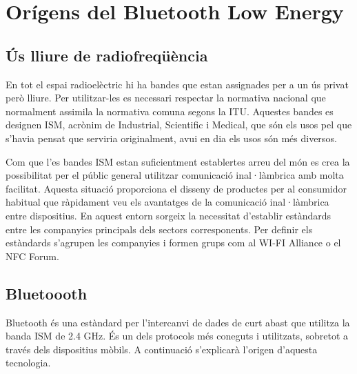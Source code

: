 \chapter{Orígens del Bluetooth Low Energy}\label{C:compaginacio}

\section{Ús lliure de radiofreqüència}
En tot el espai radioelèctric hi ha bandes que estan assignades per a un ús privat però lliure.
Per utilitzar-les es necessari respectar la normativa nacional que normalment assimila la normativa comuna segons la ITU.
Aquestes bandes es designen ISM, acrònim de Industrial, Scientific i Medical, que són els usos pel que s'havia pensat que serviria originalment, avui en dia els usos són més diversos.

Com que l'es bandes ISM estan suficientment establertes arreu del món es crea la possibilitat per el públic general utilitzar comunicació inal·làmbrica amb molta facilitat.
Aquesta situació proporciona el disseny de productes per al consumidor habitual que ràpidament veu els avantatges de la comunicació inal·làmbrica entre dispositius.
En aquest entorn sorgeix la necessitat d'establir estàndards entre les companyies principals dels sectors corresponents.
Per definir els estàndards s'agrupen les companyies i formen grups com al WI-FI Alliance o el NFC Forum.

\section{Bluetoooth}
Bluetooth és una estàndard per l'intercanvi de dades de curt abast que utilitza la banda ISM de 2.4 GHz.
És un dels protocols més coneguts i utilitzats, sobretot a través dels dispositius mòbils.
A continuació s'explicarà l'origen d'aquesta tecnologia.

